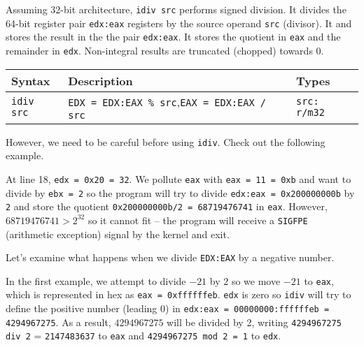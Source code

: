 \documentclass[a4paper]{article}
\begin{document}
Assuming 32-bit architecture, \texttt{idiv src} performs signed division. It divides the 64-bit register pair  \texttt{edx:eax} registers by the source operand \texttt{src} (divisor). It  and stores the result in the the pair \texttt{edx:eax}. It stores the quotient in \texttt{eax} and the remainder in \texttt{edx}. Non-integral results are truncated (chopped) towards 0.
\begin{tabular}{p{}p{}p{}} \toprule %
{Syntax} & {Description} & {Types} \\ \midrule
    \texttt{idiv src} & {\texttt{EDX = EDX:EAX \% src},\quad\quad\quad\quad\quad\quad\quad \texttt{EAX = EDX:EAX / src}} & {\texttt{src: r/m32}} \\
    \bottomrule
\end{tabular}

However, we need to be careful before using \texttt{idiv}. Check out the following example.

At line 18, \texttt{edx = 0x20 = 32}. We pollute \texttt{eax} with \texttt{eax = 11 = 0xb} and want to divide by \texttt{ebx = 2}  so the program will try to divide \texttt{edx:eax = 0x200000000b} by \texttt{2} and store the quotient \texttt{0x200000000b/2 = 68719476741} in \texttt{eax}. However, $68719476741 > 2^{32}$ so it cannot fit -- the program will receive a \texttt{SIGFPE} (arithmetic exception) signal by the kernel and exit.




%
Let's examine what happens when we divide \texttt{EDX:EAX} by a negative number. 



In the first example, we attempt to divide $-21$ by $2$ so we move $-21$ to \texttt{eax}, which is represented in hex as \texttt{eax = 0xffffffeb}. \texttt{edx} is zero so \texttt{idiv} will try to define the positive number (leading 0) in \texttt{edx:eax = 00000000:ffffffeb = 4294967275}. As a result, $4294967275$ will be divided by 2, writing \texttt{4294967275 div 2} = \texttt{2147483637} to \texttt{eax} and \texttt{4294967275 mod 2 = 1} to \texttt{edx}.
\end{document}
